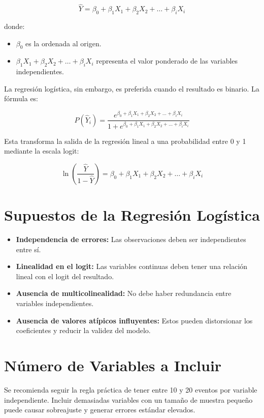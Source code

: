 \documentclass[12pt]{article}
\begin{document}
\[
\hat{Y} = \beta_0 + \beta_1 X_1 + \beta_2 X_2 + \ldots + \beta_i X_i
\]

donde:
\begin{itemize}
  \item $\beta_0$ es la ordenada al origen.
  \item $\beta_1 X_1 + \beta_2 X_2 + \ldots + \beta_i X_i$ representa el valor ponderado de las variables independientes.
\end{itemize}

La regresión logística, sin embargo, es preferida cuando el resultado es binario. La fórmula es:

\[
P(\hat{Y}_i) = \frac{e^{\beta_0 + \beta_1 X_1 + \beta_2 X_2 + \ldots + \beta_i X_i}}{1 + e^{\beta_0 + \beta_1 X_1 + \beta_2 X_2 + \ldots + \beta_i X_i}}
\]

Esta transforma la salida de la regresión lineal a una probabilidad entre 0 y 1 mediante la escala logit:

\[
\ln\left( \frac{\hat{Y}}{1 - \hat{Y}} \right) = \beta_0 + \beta_1 X_1 + \beta_2 X_2 + \ldots + \beta_i X_i
\]

\section{Supuestos de la Regresión Logística}

\begin{itemize}
  \item \textbf{Independencia de errores:} Las observaciones deben ser independientes entre sí.
  \item \textbf{Linealidad en el logit:} Las variables continuas deben tener una relación lineal con el logit del resultado.
  \item \textbf{Ausencia de multicolinealidad:} No debe haber redundancia entre variables independientes.
  \item \textbf{Ausencia de valores atípicos influyentes:} Estos pueden distorsionar los coeficientes y reducir la validez del modelo.
\end{itemize}

\section{Número de Variables a Incluir}

Se recomienda seguir la regla práctica de tener entre 10 y 20 eventos por variable independiente. Incluir demasiadas variables con un tamaño de muestra pequeño puede causar sobreajuste y generar errores estándar elevados.
\end{document}
